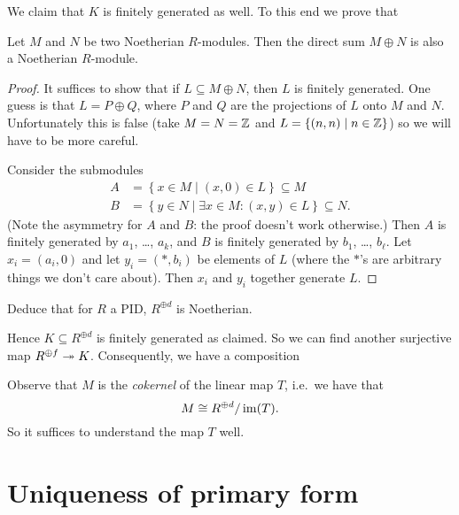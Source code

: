 We claim that $K$ is finitely generated as well.
To this end we prove that
\begin{lemma}
	Let $M$ and $N$ be two Noetherian $R$-modules.
	Then the direct sum $M \oplus N$ is also a Noetherian $R$-module.
\end{lemma}
\begin{proof}
	It suffices to show that if $L \subseteq M \oplus N$,
	then $L$ is finitely generated.
	One guess is that $L = P \oplus Q$,
	where $P$ and $Q$ are the projections of $L$ onto $M$ and $N$.
	Unfortunately this is false
	(take $M = N = \mathbb Z$ and $L = \{(n,n) \mid n \in \mathbb Z\}$)
	so we will have to be more careful.

	Consider the submodules
	\begin{align*}
		A &= \left\{ x \in M \mid (x,0) \in L \right\} \subseteq M \\
		B &= \left\{ y \in N \mid \exists x \in M : (x,y) \in L \right\}
			\subseteq N.
	\end{align*}
	(Note the asymmetry for $A$ and $B$: the proof doesn't work otherwise.)
	Then $A$ is finitely generated by $a_1$, \dots, $a_k$,
	and $B$ is finitely generated by $b_1$, \dots, $b_\ell$.
	Let $x_i = (a_i, 0)$ and let $y_i = (\ast, b_i)$ be elements of $L$
	(where the $\ast$'s are arbitrary things we don't care about).
	Then $x_i$ and $y_i$ together generate $L$.
\end{proof}
\begin{ques}
	Deduce that for $R$ a PID, $R^{\oplus d}$ is Noetherian.
\end{ques}
Hence $K \subseteq R^{\oplus d}$ is finitely generated as claimed.
So we can find another surjective map $R^{\oplus f} \twoheadrightarrow K$.
Consequently, we have a composition
\begin{center}
\end{center}
Observe that $M$ is the \emph{cokernel} of the linear map $T$,
i.e.\ we have that
\[ M \cong R^{\oplus d} / \operatorname{im}(T). \]
So it suffices to understand the map $T$ well.

\section{Uniqueness of primary form}

